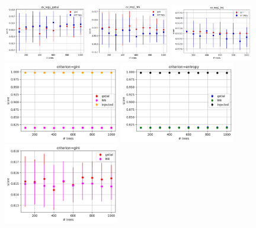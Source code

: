 \documentclass[prd,aps,twocolumn,a4paper,showkeys,nofootinbib]{revtex4-2}
\begin{document}
\begin{figure}[]
\includegraphics[width=0.32\textwidth]{./FigsClass/cv_reg1_gstlal}
\includegraphics[width=0.32\textwidth]{./FigsClass/cv_reg1_NN}
\includegraphics[width=0.32\textwidth]{./FigsClass/cv_reg1_inj}
\includegraphics[width=0.45\textwidth]{./FigsClass/reg1_cv_comparisongini}
\includegraphics[width=0.45\textwidth]{./FigsClass/reg1_cv_comparisonent}
\includegraphics[width=0.45\textwidth]{./FigsClass/reg1_cv_2comparisongini}

\end{figure}
\end{document}
